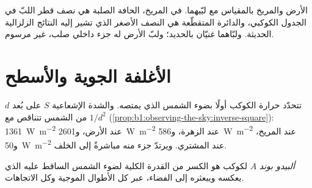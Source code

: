 \begin{omfigure}

{\small الأرض والمريخ بالمقياس مع لبّيهما. في المريخ، الحافة الصلبة هي نصف قطر اللبّ في الجدول الكوكبي، والدائرة المتقطّعة هي النصف الأصغر الذي تشير إليه النتائج الزلزالية الحديثة. ولبّاهما غنيّان بالحديد؛ ولبّ الأرض له جزء داخلي صلب، غير مرسوم.}
\end{omfigure}

\section{الأغلفة الجوية والأسطح}

تتحدّد حرارة الكوكب أولًا بضوء الشمس الذي يمتصه. والشدة الإشعاعية $S$ على بُعد $d$ من الشمس تتناقص مع $1/d^2$ (\cref{prop:b1:observing-the-sky:inverse-square}): \qty{1361}{W.m^{-2}} عند الأرض، و\qty{2601}{W.m^{-2}} عند الزهرة، و\qty{586}{W.m^{-2}} عند المريخ، و\qty{50}{W.m^{-2}} عند المشتري. ويرتدّ جزء منه مباشرةً إلى الخلف.

\begin{definition}\label{def:b1:comparative-planetology:albedo}
\emph{ألبيدو بوند} $A$ لكوكب هو الكسر من القدرة الكلية لضوء الشمس الساقط عليه الذي يعكسه ويبعثره إلى الفضاء، عبر كل الأطوال الموجية وكل الاتجاهات.
\end{definition}

